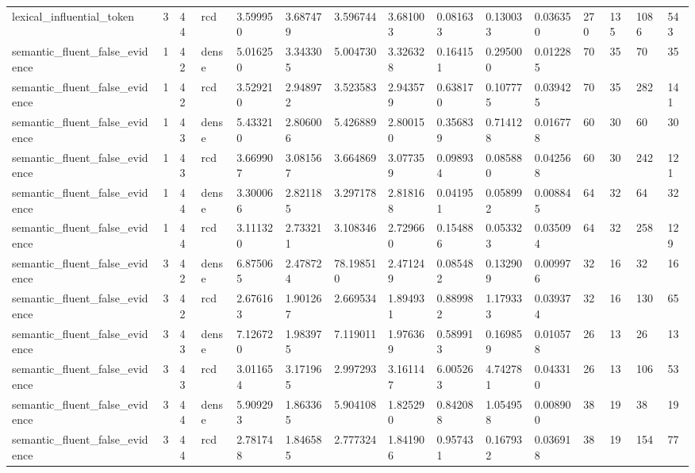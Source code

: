 \begin{tabular}{lllllllllllllll}
lexical\_influential\_token & 3 & 44 & rcd & 3.599950 & 3.687479 & 3.596744 & 3.681003 & 0.081633 & 0.130033 & 0.036350 & 270 & 135 & 1086 & 543 \\
semantic\_fluent\_false\_evidence & 1 & 42 & dense & 5.016250 & 3.343305 & 5.004730 & 3.326328 & 0.164151 & 0.295000 & 0.012285 & 70 & 35 & 70 & 35 \\
semantic\_fluent\_false\_evidence & 1 & 42 & rcd & 3.529210 & 2.948972 & 3.523583 & 2.943579 & 0.638170 & 0.107775 & 0.039425 & 70 & 35 & 282 & 141 \\
semantic\_fluent\_false\_evidence & 1 & 43 & dense & 5.433210 & 2.806006 & 5.426889 & 2.800150 & 0.356839 & 0.714128 & 0.016778 & 60 & 30 & 60 & 30 \\
semantic\_fluent\_false\_evidence & 1 & 43 & rcd & 3.669907 & 3.081567 & 3.664869 & 3.077359 & 0.098934 & 0.085880 & 0.042568 & 60 & 30 & 242 & 121 \\
semantic\_fluent\_false\_evidence & 1 & 44 & dense & 3.300066 & 2.821185 & 3.297178 & 2.818168 & 0.041951 & 0.058992 & 0.008845 & 64 & 32 & 64 & 32 \\
semantic\_fluent\_false\_evidence & 1 & 44 & rcd & 3.111320 & 2.733211 & 3.108346 & 2.729660 & 0.154886 & 0.053323 & 0.035094 & 64 & 32 & 258 & 129 \\
semantic\_fluent\_false\_evidence & 3 & 42 & dense & 6.875065 & 2.478724 & 78.198510 & 2.471249 & 0.085482 & 0.132909 & 0.009976 & 32 & 16 & 32 & 16 \\
semantic\_fluent\_false\_evidence & 3 & 42 & rcd & 2.676163 & 1.901267 & 2.669534 & 1.894931 & 0.889982 & 1.179333 & 0.039374 & 32 & 16 & 130 & 65 \\
semantic\_fluent\_false\_evidence & 3 & 43 & dense & 7.126720 & 1.983975 & 7.119011 & 1.976369 & 0.589913 & 0.169859 & 0.010578 & 26 & 13 & 26 & 13 \\
semantic\_fluent\_false\_evidence & 3 & 43 & rcd & 3.011654 & 3.171965 & 2.997293 & 3.161147 & 6.005263 & 4.742781 & 0.043310 & 26 & 13 & 106 & 53 \\
semantic\_fluent\_false\_evidence & 3 & 44 & dense & 5.909293 & 1.863365 & 5.904108 & 1.825290 & 0.842088 & 1.054958 & 0.008900 & 38 & 19 & 38 & 19 \\
semantic\_fluent\_false\_evidence & 3 & 44 & rcd & 2.781748 & 1.846585 & 2.777324 & 1.841906 & 0.957431 & 0.167932 & 0.036918 & 38 & 19 & 154 & 77 \\
\bottomrule
\end{tabular}
